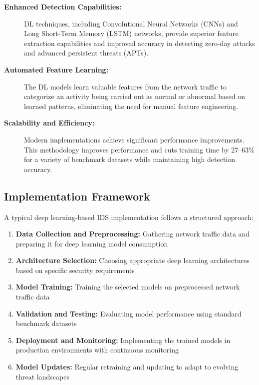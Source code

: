\documentclass[12pt]{report}
\begin{document}
\begin{description}
    \item[\textbf{Enhanced Detection Capabilities:}] DL techniques, including Convolutional Neural Networks (CNNs) and Long Short-Term Memory (LSTM) networks, provide superior feature extraction capabilities and improved accuracy in detecting zero-day attacks and advanced persistent threats (APTs).

    \item[\textbf{Automated Feature Learning:}] The DL models learn valuable features from the network traffic to categorize an activity being carried out as normal or abnormal based on learned patterns, eliminating the need for manual feature engineering.

    \item[\textbf{Scalability and Efficiency:}] Modern implementations achieve significant performance improvements. This methodology improves performance and cuts training time by 27–63\% for a variety of benchmark datasets while maintaining high detection accuracy.
\end{description}

\subsection{Implementation Framework}
A typical deep learning-based IDS implementation follows a structured approach:

\begin{enumerate}
    \item \textbf{Data Collection and Preprocessing:} Gathering network traffic data and preparing it for deep learning model consumption
    \item \textbf{Architecture Selection:} Choosing appropriate deep learning architectures based on specific security requirements
    \item \textbf{Model Training:} Training the selected models on preprocessed network traffic data
    \item \textbf{Validation and Testing:} Evaluating model performance using standard benchmark datasets
    \item \textbf{Deployment and Monitoring:} Implementing the trained models in production environments with continuous monitoring
    \item \textbf{Model Updates:} Regular retraining and updating to adapt to evolving threat landscapes
\end{enumerate}
\end{document}
